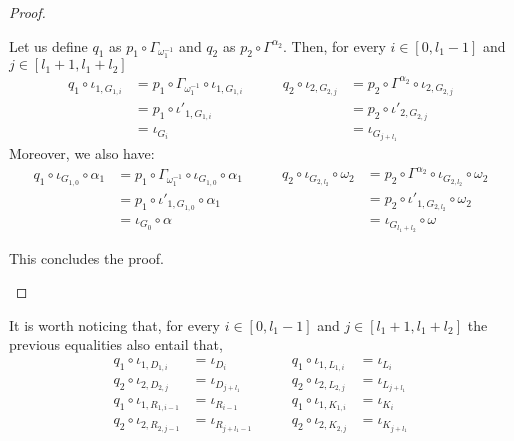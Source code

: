 \begin{proof}
\begin{itemize}
	Let us define $q_1$ as $p_1\circ \Gamma_{\omega^{-1}_1}$ and $q_2$ as $p_2\circ \Gamma^{\alpha_2}$. Then, for every $i\in [0,l_1-1]$ and $j\in [l_1+1, l_1+l_2]$
	\[\begin{split}
		q_1\circ \iota_{1, G_{1,i}}&=p_1\circ \Gamma_{\omega^{-1}_1}\circ \iota_{1, G_{1,i}}\\&=p_1\circ \iota'_{1, G_{1,i}} \\&=\iota_{G_{i}}
	\end{split} \qquad \begin{split}
		q_2\circ \iota_{2, G_{2,j}}&=p_2\circ \Gamma^{\alpha_2}\circ \iota_{2, G_{2,j}}\\&=p_2\circ \iota'_{2, G_{2,j}} \\&=\iota_{G_{j+l_1}}
	\end{split}\]
	Moreover, we also have:
	\[
	\begin{split}
		q_1\circ \iota_{G_{1,0}}\circ \alpha_1&= p_1\circ \Gamma_{\omega^{-1}_1}\circ \iota_{G_{1,0}}\circ \alpha_1 \\&=p_1\circ \iota'_{1, G_{1,0}} \circ \alpha_1 \\&= \iota_{G_{0}}\circ \alpha
	\end{split}\qquad 
	\begin{split}
	q_2\circ \iota_{G_{2,l_2}}\circ \omega_2&= p_2\circ \Gamma^{\alpha_2}\circ \iota_{G_{2,l_2}}\circ \omega_2 \\&=p_2\circ \iota'_{1, G_{2,l_2}} \circ \omega_2 \\&= \iota_{G_{l_1+l_2}}\circ \omega
	\end{split} \] 
	
	This concludes the proof. \qedhere
\end{itemize}	
\end{proof}
 
	
\begin{remark}\label{rem:dett2}
It is worth noticing that, for every $i\in [0,l_1-1]$ and $j\in [l_1+1, l_1+l_2]$ the previous equalities also entail that,
\[\begin{split}q_1\circ \iota_{1, D_{1,i}}&=\iota_{D_{i}}\\q_2\circ \iota_{2, D_{2,j}}&=\iota_{D_{j+l_1}} 	\\q_1\circ \iota_{1, R_{1,i-1}}&=\iota_{R_{i-1}} \\
	q_2\circ \iota_{2, R_{2,j-1}}&=\iota_{R_{j+l_1-1}}
\end{split} \qquad 
\begin{split}    	q_1\circ \iota_{1, L_{1,i}}&=\iota_{L_{i}} \\q_2\circ \iota_{2, L_{2,j}}&=\iota_{L_{j+l_1}}\\ q_1\circ \iota_{1, K_{1,i}}&=\iota_{K_{i}}\\q_2\circ \iota_{2, K_{2,j}}&=\iota_{K_{j+l_1}}\end{split}\]
\end{remark}

